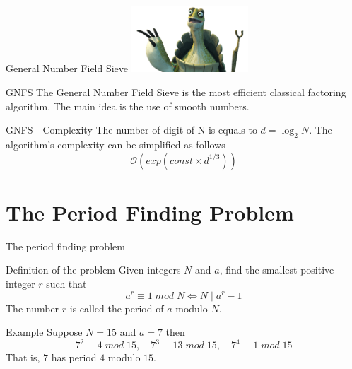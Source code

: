 \documentclass{beamer}
\begin{document}
    \begin{frame}{General Number Field Sieve}
        \centering
        \includegraphics[height=2.5cm, keepaspectratio]{images/turtle.png}
        \begin{alertblock}{GNFS}
            The General Number Field Sieve is the most efficient classical factoring algorithm. The main idea is the use of smooth numbers.
        \end{alertblock}

        \begin{exampleblock}{GNFS - Complexity}
            The number of digit of N is equals to $d = \log_2N$.
            The algorithm's complexity can be simplified as follows
            $$\mathcal{O}(exp(const \times d^{1/3}))$$
        \end{exampleblock}
    \end{frame}

    \section{The Period Finding Problem}
    \begin{frame}{The period finding problem}
        \begin{alertblock}{Definition of the problem}
            Given integers $N$ and $a$, find the smallest positive integer $r$ such that
            $$ a^r \equiv 1 \; mod \; N \iff N \; | \; a^r - 1$$
            The number $r$ is called the period of $a$ modulo $N$.
        \end{alertblock}

        \begin{exampleblock}{Example}
            Suppose $N = 15$ and $a=7$ then
            \begin{equation*}
                    7^2 \equiv 4 \; mod \; 15, \quad
                    7^3 \equiv 13 \; mod \; 15, \quad
                    7^4 \equiv 1 \; mod \; 15 
            \end{equation*}
            That is, $7$ has period $4$ modulo $15$.
        \end{exampleblock}
    \end{frame}
    
\end{document}

